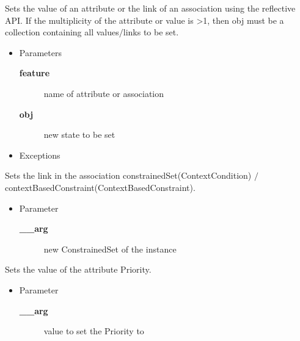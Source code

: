 \begin{desc}Sets the value of an attribute or the link of an association using the
 reflective API. If the multiplicity of the attribute or value is \textgreater  1,
 then obj must be a collection containing all values$/$links to be set.
\begin{itemize}
\item{Parameters
  \begin{description}
   \item[{\bf feature}]{name of attribute or association}
   \item[{\bf obj}]{new state to be set}
  \end{description}}
\end{itemize}
\begin{itemize}
\item{{Exceptions}
}
\end{itemize}
\end{desc}

\begin{desc}Sets the link in the association constrainedSet(ContextCondition)
 $/$ contextBasedConstraint(ContextBasedConstraint).
\begin{itemize}
\item{Parameter
  \begin{description}
   \item[{\bf \_\_arg}]{new ConstrainedSet of the instance}
  \end{description}}
\end{itemize}
\end{desc}

\begin{desc}Sets the value of the attribute Priority.
\begin{itemize}
\item{Parameter
  \begin{description}
   \item[{\bf \_\_arg}]{value to set the Priority to}
  \end{description}}
\end{itemize}
\end{desc}

